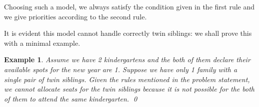 \documentclass{article}
\newtheorem*{example}{Example}
\begin{document}
Choosing such a model, we always satisfy the condition given in the first rule and we
give priorities according to the second rule.

It is evident this model cannot handle correctly twin siblings: we shall prove this
with a minimal example.

\begin{example}
	Assume we have 2 kindergartens and the both of them declare their available spots
	for the new year are 1. Suppose we have only 1 family with a single pair of twin
	siblings. Given the rules mentioned in the problem statement, we cannot allocate
	seats for the twin siblings because it is not possible for the both of them to
	attend the same kindergarten. \qed
\end{example}
\end{document}

